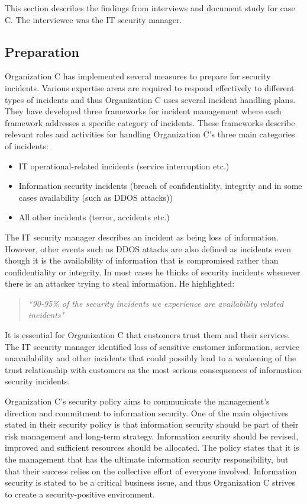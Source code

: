 This section describes the findings from interviews and document study for case C. The interviewee was the IT security manager. 

\subsection{Preparation}
Organization C has implemented several measures to prepare for security incidents. Various expertise areas are required to respond effectively to different types of incidents and thus Organization C uses several incident handling plans. They have developed three frameworks for incident management where each framework addresses a specific category of incidents. These frameworks describe relevant roles and activities for handling Organization C's three main categories of incidents:

\begin{itemize}
\item IT operational-related incidents (service interruption etc.)
\item Information security incidents (breach of confidentiality, integrity and in some cases availability (such as DDOS attacks))
\item All other incidents (terror, accidents etc.)
\end{itemize}
 
The IT security manager describes an incident as being loss of information. However, other events such as DDOS attacks are also defined as incidents even though it is the availability of information that is compromised rather than confidentiality or integrity. In most cases he thinks of security incidents whenever there is an attacker trying to steal information. He highlighted:

\begin{quote}
\textit{``90-95\% of the security incidents we experience are availability related incidents"}
\end{quote} 
 
It is essential for Organization C that customers trust them and their services. The IT security manager identified loss of sensitive customer information, service unavailability and other incidents that could possibly lead to a weakening of the trust relationship with customers as the most serious consequences of information security incidents. 

Organization C's security policy aims to communicate the management's direction and commitment to information security. One of the main objectives stated in their security policy is that information security should be part of their risk management and long-term strategy. Information security should be revised, improved and sufficient resources should be allocated. The policy states that it is the management that has the ultimate information security responsibility, but that their success relies on the collective effort of everyone involved. Information security is stated to be a critical business issue, and thus Organization C strives to create a security-positive environment.

